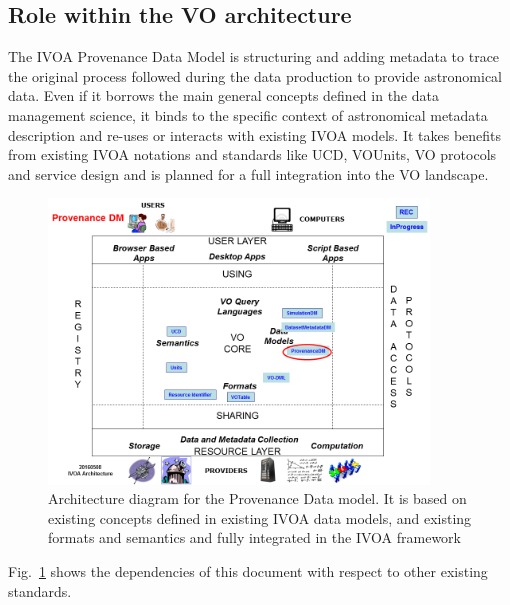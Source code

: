 \subsection{Role within the VO architecture}

The IVOA Provenance Data Model is structuring and adding metadata to trace the original process followed during the data production to provide astronomical data. Even if it borrows the main general concepts defined in the data management science, it binds to the specific context of astronomical metadata description and re-uses or interacts with existing IVOA models.
It takes benefits from existing IVOA notations and standards like UCD, VOUnits, VO protocols and service design and is planned for a full integration into the VO landscape.

\begin{figure}
\centering
\includegraphics[width=0.9\textwidth]{VOArchitecture-Prov2016.png}
\caption{Architecture diagram for the Provenance Data model. It is based on existing concepts defined in existing IVOA data models, and existing formats and semantics and fully integrated in the IVOA framework}
\label{fig:archdiag}
\end{figure}

Fig.~\ref{fig:archdiag} shows the dependencies of this document with respect to other existing standards.
